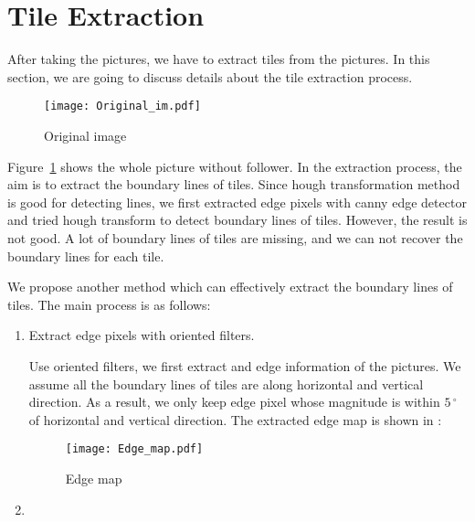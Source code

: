 \usepackage{graphics}
\section{Tile Extraction}
After taking the pictures, we have to extract tiles from the pictures.
In this section, we are going to discuss details about the tile 
extraction process.

\begin{figure}[htbp]
	  \centering
	  \texttt{[image: Original\_im.pdf]}
	  \caption{Original image}
	  \label{Original_im}
\end{figure}

Figure~\ref{Original_im} shows the whole picture without follower. 
In the extraction process, the aim is to extract the boundary lines of 
tiles. Since hough transformation method is good for detecting lines, we
first extracted edge pixels with canny edge detector and tried hough 
transform to detect boundary lines of tiles. However, the result is not 
good. A lot of boundary lines of tiles are missing, and we can not recover 
the boundary lines for each tile.

We propose another method which can effectively extract the boundary lines of
 tiles. The main process is as follows:
\begin{enumerate}
	\item Extract edge pixels with oriented filters.
	
			Use oriented filters, we first extract and edge information of the 
			pictures. We assume all the boundary lines of tiles are along horizontal 
			and vertical direction. As a result, we only keep edge pixel whose 
			magnitude is within $5\,^{\circ}$ of horizontal and vertical direction. 
			The extracted edge map is shown in :
			
			
			\begin{figure}[htbp]
				  \centering
				  \texttt{[image: Edge\_map.pdf]}
				  \caption{Edge map}
				  \label{Edge_map}
			\end{figure}
	\item
\end{enumerate}

 

